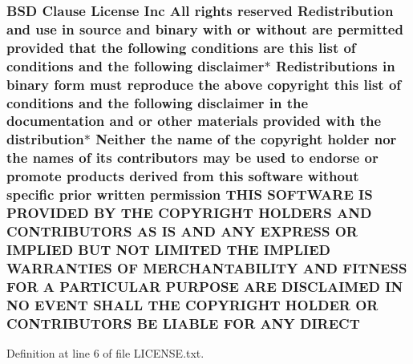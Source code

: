 \subsubsection[{\texorpdfstring{D\+I\+R\+E\+CT}{DIRECT}}]{\setlength{\rightskip}{0pt plus 5cm}B\+SD Clause License Inc All rights reserved Redistribution and use in source and binary with or without are permitted provided that the following conditions are this list of conditions and the following disclaimer$\ast$ Redistributions in binary form must reproduce the above copyright this list of conditions and the following disclaimer in the documentation and or other materials provided with the distribution$\ast$ Neither the name of the copyright holder nor the names of its contributors may be used to endorse or promote products derived from this software without specific prior written permission T\+H\+IS S\+O\+F\+T\+W\+A\+RE IS P\+R\+O\+V\+I\+D\+ED BY T\+HE C\+O\+P\+Y\+R\+I\+G\+HT H\+O\+L\+D\+E\+RS A\+ND C\+O\+N\+T\+R\+I\+B\+U\+T\+O\+RS AS IS A\+ND A\+NY E\+X\+P\+R\+E\+SS OR I\+M\+P\+L\+I\+ED B\+UT N\+OT L\+I\+M\+I\+T\+ED T\+HE I\+M\+P\+L\+I\+ED {\bf W\+A\+R\+R\+A\+N\+T\+I\+ES} OF M\+E\+R\+C\+H\+A\+N\+T\+A\+B\+I\+L\+I\+TY A\+ND F\+I\+T\+N\+E\+SS F\+OR A P\+A\+R\+T\+I\+C\+U\+L\+AR P\+U\+R\+P\+O\+SE A\+RE D\+I\+S\+C\+L\+A\+I\+M\+ED IN NO E\+V\+E\+NT S\+H\+A\+LL T\+HE C\+O\+P\+Y\+R\+I\+G\+HT H\+O\+L\+D\+ER OR C\+O\+N\+T\+R\+I\+B\+U\+T\+O\+RS BE L\+I\+A\+B\+LE F\+OR A\+NY D\+I\+R\+E\+CT}\hypertarget{LICENSE_8txt_a34cac86a32266331f931bceaa138a96d}{}\label{LICENSE_8txt_a34cac86a32266331f931bceaa138a96d}


Definition at line 6 of file L\+I\+C\+E\+N\+S\+E.\+txt.


